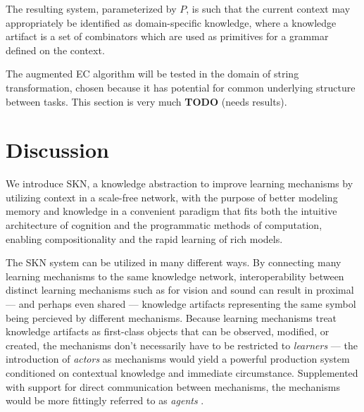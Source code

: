 \documentclass[11pt,letterpaper]{article}
\begin{document}
The resulting system, parameterized by $P$, is such that the current context
may appropriately be identified as domain-specific knowledge, where a
knowledge artifact is a set of combinators which are used as primitives for
a grammar defined on the context.

The augmented EC algorithm will be tested in the domain of string
transformation, chosen because it has potential for common underlying
structure between tasks. This section is very much {\bf TODO} (needs
results).


\section{Discussion}

We introduce SKN, a knowledge abstraction to improve learning mechanisms by
utilizing context in a scale-free network, with the purpose of better
modeling memory and knowledge in a convenient paradigm that fits both the
intuitive architecture of cognition and the programmatic methods of
computation, enabling compositionality and the rapid learning of rich
models.

The SKN system can be utilized in many different ways. By connecting many
learning mechanisms to the same knowledge network, interoperability between
distinct learning mechanisms such as for vision and sound can result in
proximal --- and perhaps even shared --- knowledge artifacts representing
the same symbol being percieved by different mechanisms. Because learning
mechanisms treat knowledge artifacts as first-class objects that can be
observed, modified, or created, the mechanisms don't necessarily have to be
restricted to \emph{learners} --- the introduction of \emph{actors} as
mechanisms would yield a powerful production system conditioned on
contextual knowledge and immediate circumstance. Supplemented with support
for direct communication between mechanisms, the mechanisms would be more
fittingly referred to as \emph{agents} \cite{minsky88}.
\end{document}
